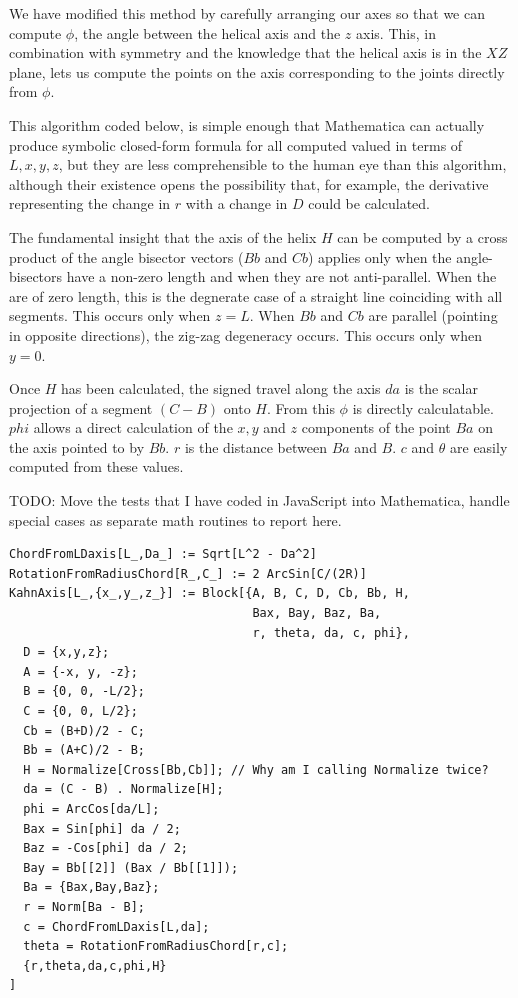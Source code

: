 \documentclass[11pt]{article}
\begin{document}
{We have modified this method by carefully arranging our axes
so that we can compute $\phi$, the angle between the helical axis
and the $z$ axis. This, in combination with symmetry and the knowledge
that the helical axis is in the $XZ$ plane, lets us compute the
points on the axis corresponding to the joints directly from $\phi$.

This algorithm coded below, is simple enough that Mathematica can
actually produce symbolic closed-form formula for all computed valued
in terms of $L, x, y, z$, but they are less comprehensible to the
human eye than this algorithm, although their existence opens
the possibility that, for example, the derivative representing
the change in $r$ with a change in $D$ could be calculated.

The fundamental insight that the axis of the helix $H$ can be
computed by a cross product of the angle bisector
vectors ($Bb$ and $Cb$) applies only
when the angle-bisectors have a non-zero length and when
they are not anti-parallel. When the are of zero length, this is
the degnerate case of a straight line coinciding with all segments.
This occurs only when $z = L$.
When $Bb$ and $Cb$ are parallel (pointing in opposite directions),
the zig-zag degeneracy occurs. This occurs only when $y = 0$.

Once $H$ has been calculated, the signed travel along the axis $da$ is
the scalar projection of a segment $(C - B)$ onto $H$.
From this $\phi$ is directly calculatable. $phi$ allows
a direct calculation of the $x,y$ and $z$ components of the
point $Ba$ on the axis pointed to by $Bb$.
$r$ is the distance between $Ba$ and $B$. $c$ and $\theta$
are easily computed from these values.

TODO: Move the tests that I have coded in JavaScript into
Mathematica, handle special cases as separate math routines
to report here.

\begin{lstlisting}
ChordFromLDaxis[L_,Da_] := Sqrt[L^2 - Da^2]
RotationFromRadiusChord[R_,C_] := 2 ArcSin[C/(2R)]
KahnAxis[L_,{x_,y_,z_}] := Block[{A, B, C, D, Cb, Bb, H,
                                  Bax, Bay, Baz, Ba, 
                                  r, theta, da, c, phi},
  D = {x,y,z};
  A = {-x, y, -z};
  B = {0, 0, -L/2};
  C = {0, 0, L/2};
  Cb = (B+D)/2 - C;
  Bb = (A+C)/2 - B;
  H = Normalize[Cross[Bb,Cb]]; // Why am I calling Normalize twice?
  da = (C - B) . Normalize[H];
  phi = ArcCos[da/L];
  Bax = Sin[phi] da / 2;
  Baz = -Cos[phi] da / 2;
  Bay = Bb[[2]] (Bax / Bb[[1]]);
  Ba = {Bax,Bay,Baz};
  r = Norm[Ba - B];
  c = ChordFromLDaxis[L,da];
  theta = RotationFromRadiusChord[r,c];
  {r,theta,da,c,phi,H}
]
\end{lstlisting}

}
\end{document}
